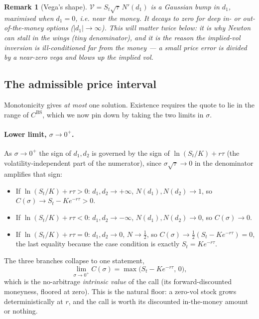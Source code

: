\documentclass[11pt]{article}
\newtheorem{remark}{Remark}
\newcommand{\BS}{\mathrm{BS}}
\newcommand{\Vega}{\mathcal{V}}
\begin{document}
\begin{remark}[Vega's shape]
$\Vega=S_t\sqrt{\tau}\,N'(d_1)$ is a Gaussian bump in $d_1$, maximised when $d_1=0$, i.e. near the
money. It decays to zero for deep in- or out-of-the-money options ($|d_1|\to\infty$). This will
matter twice below: it is why Newton can stall in the wings (tiny denominator), and it is the
reason the implied-vol \emph{inversion} is ill-conditioned far from the money --- a small price
error is divided by a near-zero vega and blows up the implied vol.
\end{remark}

\subsection{The admissible price interval}

Monotonicity gives \emph{at most} one solution. Existence requires the quote to lie in the range
of $C^{\BS}$, which we now pin down by taking the two limits in $\sigma$.

\paragraph{Lower limit, $\sigma\to0^+$.} As $\sigma\to0^+$ the sign of $d_1,d_2$ is governed by
the sign of $\ln(S_t/K)+r\tau$ (the volatility-independent part of the numerator), since
$\sigma\sqrt{\tau}\to0$ in the denominator amplifies that sign:
\begin{itemize}[nosep]
\item If $\ln(S_t/K)+r\tau>0$: $d_1,d_2\to+\infty$, $N(d_1),N(d_2)\to1$, so
      $C(\sigma)\to S_t-Ke^{-r\tau}>0$.
\item If $\ln(S_t/K)+r\tau<0$: $d_1,d_2\to-\infty$, $N(d_1),N(d_2)\to0$, so $C(\sigma)\to0$.
\item If $\ln(S_t/K)+r\tau=0$: $d_1,d_2\to0$, $N\to\tfrac12$, so
      $C(\sigma)\to\tfrac12(S_t-Ke^{-r\tau})=0$, the last equality because the case condition is
      exactly $S_t=Ke^{-r\tau}$.
\end{itemize}
The three branches collapse to one statement,
\begin{equation}\label{eq:lower}
\lim_{\sigma\to0^+}C(\sigma)=\max\!\big(S_t-Ke^{-r\tau},\,0\big),
\end{equation}
which is the no-arbitrage \emph{intrinsic value} of the call (its forward-discounted moneyness,
floored at zero). This is the natural floor: a zero-vol stock grows deterministically at $r$, and
the call is worth its discounted in-the-money amount or nothing.
\end{document}
